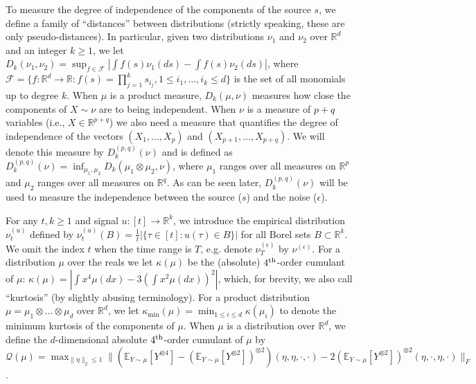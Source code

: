 \documentclass[11pt]{article}
\newcommand{\todoc}[2][]{ \todo[color=Apricot,size=\tiny,#1]{#2}} %
\newcommand{\E}{\mathbb{E}}
\newcommand{\real}{\mathbb{R}}
\newcommand{\cQ}{\mathcal{Q}}
\newcommand{\eps}{\epsilon}
\begin{document}
To measure the degree of independence of the components of the source $s$, we define
a family of ``distances'' between distributions (strictly speaking, these are only pseudo-distances).
In particular, given two distributions $\nu_1$ and $\nu_2$ over $\real^d$ and an integer $k\ge 1$, we
let $D_k(\nu_1,\nu_2) = \sup_{f\in\mathcal{F}} |\int f(s)\nu_1(ds) - \int f(s)\nu_2(ds)|$, 
where $\mathcal{F}=\{f:\real^d \to \real : f(s)=\prod_{j=1}^k s_{i_j}, 1 \le i_1,\ldots,i_k \le d\}$ 
is the set of all monomials up to degree $k$.
When $\mu$ is a product measure, $D_k(\mu,\nu)$ measures how close the components of $X\sim \nu$ are to being independent.
When $\nu$ is a measure of $p+q$ variables (i.e., $X\in \real^{p+q}$) 
we also need a measure that quantifies the degree of independence of the vectors $(X_1,\dots,X_p)$ and $(X_{p+1},\dots,X_{p+q})$. We will denote this measure by $D_k^{(p,q)}(\nu)$ and is defined as $D_k^{(p,q)} (\nu)= \inf_{\mu_1,\mu_2} D_k(\mu_1\otimes \mu_2,\nu)$, where $\mu_1$ ranges over all measures on $\real^p$ and $\mu_2$ ranges over all measures on $\real^q$. 
As can be seen later, $D_k^{(p,q)}(\nu)$ will be used to measure the independence between the source ($s$) and the noise ($\eps$).


For any $t,k \ge 1$ and signal $u:[t] \to \real^k$, we introduce the empirical distribution $\nu_t^{(u)}$ defined by
$\nu_t^{(u)}(B)=\tfrac{1}{t}|\{\tau \in [t]: u(\tau) \in B\}|$ for all Borel sets $B \subset \real^k$. We omit the index $t$ when the time range is $T$, e.g. denote $\nu_T^{(\eps)}$ by $\nu^{(\eps)}$. 
For a distribution $\mu$ over the reals we let $\kappa(\mu)$ be the (absolute) $4^{\rm th}$-order cumulant of $\mu$: 
$\kappa(\mu) = |\int x^4 \mu(dx) - 3 (\int x^2 \mu(dx))^2|$, which, for brevity, we also call ``kurtosis'' (by slightly abusing terminology).
For a product distribution $\mu= \mu_1\otimes \ldots \otimes \mu_d$ over $\real^d$, we let $\kappa_{\min}(\mu)
=\min_{1\le i \le d} \kappa(\mu_i)$ to denote the minimum kurtosis of the components of $\mu$.
When $\mu$ is a distribution over $\real^d$, we define the $d$-dimensional absolute 
$4^{\rm th}$-order cumulant of $\mu$ by 
$\cQ(\mu) = \max_{\|\eta\|_2 \le 1}\| \left(\E_{Y\sim \mu} [Y^{\otimes4}] - (\E_{Y\sim \mu} [Y^{\otimes2}])^{\otimes 2}\right)(\eta,\eta,\cdot,\cdot)  - 2 (\E_{Y\sim \mu} [Y^{\otimes2}])^{\otimes 2}(\eta,\cdot,\eta,\cdot)\|_F $.
\end{document}
